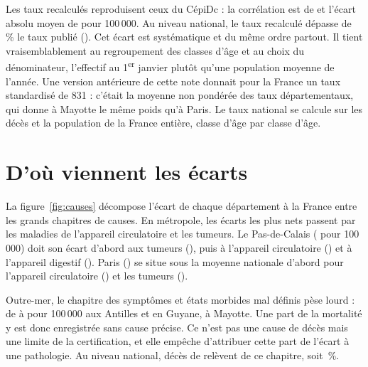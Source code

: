 \documentclass[11pt,a4paper]{article}
\begin{document}
Les taux recalculés reproduisent ceux du CépiDc : la corrélation est de
\ctrlCor{} et l'écart absolu moyen de \ctrlEcartMoyen{} pour 100\,000. Au niveau
national, le taux recalculé dépasse de \frEcartCepidc\,\% le taux publié
(\frCepidc). Cet écart est systématique et du même ordre partout. Il tient
vraisemblablement au regroupement des classes d'âge et au choix du dénominateur,
l'effectif au 1\textsuperscript{er} janvier plutôt qu'une population moyenne de
l'année. Une version antérieure de cette note donnait pour la France un taux
standardisé de 831 : c'était la moyenne non pondérée des \nDep{} taux
départementaux, qui donne à Mayotte le même poids qu'à Paris. Le taux national se
calcule sur les décès et la population de la France entière, classe d'âge par
classe d'âge.

\begin{table}[t]
\centering
\caption{Taux de mortalité toutes causes, tous sexes, \annee{} (pour 100\,000) :
départements aux taux standardisés les plus élevés et les plus faibles, avec
l'intervalle de confiance à 95\,\% du taux standardisé.}
\label{tab:extremes}

\end{table}

\section{D'où viennent les écarts}
La figure~\ref{fig:causes} décompose l'écart de chaque département à la France
entre les grands chapitres de causes. En métropole, les écarts les plus nets
passent par les maladies de l'appareil circulatoire et les tumeurs. Le
Pas-de-Calais (\pdcEcart{} pour 100\,000) doit son écart d'abord aux tumeurs
(\pdcTumeurs), puis à l'appareil circulatoire (\pdcCirc) et à l'appareil
digestif (\pdcDigestif). Paris (\parisEcart) se situe sous la moyenne nationale
d'abord pour l'appareil circulatoire (\parisCirc) et les tumeurs
(\parisTumeurs).

Outre-mer, le chapitre des symptômes et états morbides mal définis pèse lourd :
de \outremerMdMin{} à \outremerMdMax{} pour 100\,000 aux Antilles et en Guyane,
\mayotteMd{} à Mayotte. Une part de la mortalité y est donc enregistrée sans cause
précise. Ce n'est pas une cause de décès mais une limite de la certification, et
elle empêche d'attribuer cette part de l'écart à une pathologie. Au niveau
national, \malDefinies{} décès de \annee{} relèvent de ce chapitre, soit
\malDefiniesPct\,\%.
\end{document}
